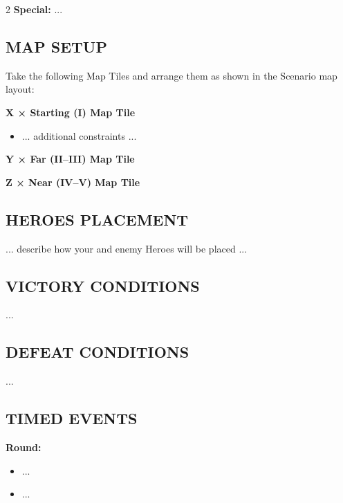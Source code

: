 \begin{multicols*}{2}
\textbf{Special:} ...

\subsection*{\MakeUppercase{Map Setup}}

Take the following Map Tiles and arrange them as shown in the Scenario map layout:

\textbf{X × Starting (I) Map Tile}
\begin{itemize}
    \item ... additional constraints ...
\end{itemize}

\textbf{Y × Far (II--III) Map Tile}

\textbf{Z × Near (IV--V) Map Tile}

\subsection*{\MakeUppercase{Heroes Placement}}

... describe how your and enemy Heroes will be placed ...

\subsection*{\MakeUppercase{Victory Conditions}}
...

\subsection*{\MakeUppercase{Defeat Conditions}}
...

\subsection*{\MakeUppercase{Timed Events}}

%

\textbf{ Round:}
\begin{itemize}
  \item ...
  \item ...
\end{itemize}

%
%
%


\end{multicols*}
